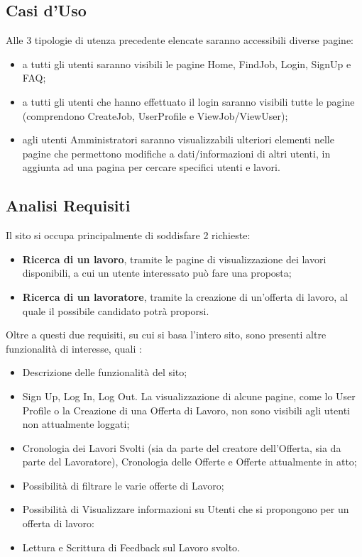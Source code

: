   \subsection{Casi d'Uso}
    Alle 3 tipologie di utenza precedente elencate saranno accessibili diverse pagine:
    \begin{itemize}
      \item a tutti gli utenti saranno visibili le pagine Home, FindJob, Login, SignUp e FAQ;
      \item a tutti gli utenti che hanno effettuato il login saranno visibili tutte le pagine (comprendono CreateJob, UserProfile e ViewJob/ViewUser);
      \item agli utenti Amministratori saranno visualizzabili ulteriori elementi nelle pagine che permettono modifiche a dati/informazioni di altri utenti, in aggiunta ad una pagina per cercare specifici utenti e lavori.
    \end{itemize}

  \subsection{Analisi Requisiti} 
    Il sito si occupa principalmente di soddisfare 2 richieste:
    \begin{itemize}
      \item \textbf{Ricerca di un lavoro}, tramite le pagine di visualizzazione dei lavori disponibili, a cui un utente interessato può fare una proposta;
      \item \textbf{Ricerca di un lavoratore}, tramite la creazione di un’offerta di lavoro, al quale il possibile candidato potrà proporsi.
    \end{itemize}
    Oltre a questi due requisiti, su cui si basa l’intero sito, sono presenti altre funzionalità di interesse, quali :
    \begin{itemize}
      \item Descrizione delle funzionalità del sito;
      \item Sign Up, Log In, Log Out. La visualizzazione di alcune pagine, come lo User Profile o la Creazione di una Offerta di Lavoro, non sono visibili agli utenti non 
      attualmente loggati;
      \item Cronologia dei Lavori Svolti (sia da parte del creatore dell’Offerta, sia da parte del Lavoratore), Cronologia delle Offerte e Offerte attualmente in atto;
      \item Possibilità di filtrare le varie offerte di Lavoro;
      \item Possibilità di Visualizzare informazioni su Utenti che si propongono per un offerta di lavoro:
      \item Lettura e Scrittura di Feedback sul Lavoro svolto.
    \end{itemize}
